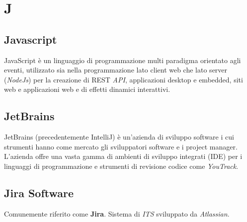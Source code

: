 \chapter{J}

\section{Javascript}
JavaScript è un linguaggio di programmazione multi paradigma orientato agli eventi, utilizzato sia nella programmazione lato client web che lato server (\emph{NodeJs}) per la creazione di REST \emph{API}, applicazioni desktop e embedded, siti web e applicazioni web e di effetti dinamici interattivi.

\section{JetBrains}
JetBrains (precedentemente IntelliJ) è un'azienda di sviluppo software i cui strumenti hanno come mercato gli sviluppatori software e i project manager. L'azienda offre una vasta gamma di ambienti di sviluppo integrati (IDE) per i linguaggi di programmazione e strumenti di revisione codice come \emph{YouTrack}. 

\section{Jira Software}\label{sec:Jira}
Comunemente riferito come \textbf{Jira}. Sistema di \emph{ITS} sviluppato da \emph{Atlassian}.



